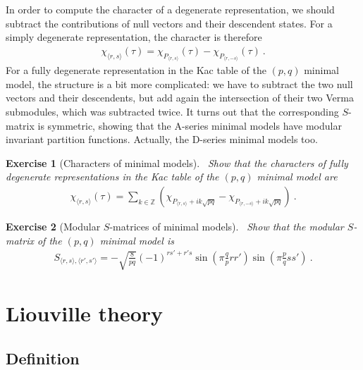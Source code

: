 \documentclass[12pt, a4paper]{article}
\theoremstyle{break}
\newtheorem{exo}{Exercise}[section]
\begin{document}
In order to compute the character of a degenerate representation, we should subtract the contributions of null vectors and their descendent states. For a simply degenerate representation, the character is therefore
\begin{align}
 \chi_{\langle r,s\rangle}(\tau) = \chi_{P_{\langle r,s\rangle}}(\tau) - \chi_{P_{\langle r,-s\rangle}}(\tau)\ .
\end{align}
For a fully degenerate representation in the Kac table of the $(p, q)$ minimal model, the structure is a bit more complicated: we have to subtract the two null vectors and their descendents, but add again the intersection of their two Verma submodules, which was subtracted twice.
It turns out that 
the corresponding $S$-matrix is symmetric, showing that the A-series minimal models have modular invariant partition functions. Actually, the D-series minimal models too. 

\begin{tcolorbox}
\begin{exo}[Characters of minimal models]
 ~\label{exo:chmm}
 Show that the characters of fully degenerate representations in the Kac table of the $(p, q)$ minimal model are
 \begin{align}
 \chi_{\langle r,s\rangle}(\tau) = \sum_{k\in\mathbb{Z}} \left( \chi_{P_{\langle r,s\rangle} + ik\sqrt{pq}} - \chi_{P_{\langle r,-s\rangle} + ik\sqrt{pq}}\right)\ .
 \label{eq:chmm}
\end{align}
\end{exo}

\begin{exo}[Modular $S$-matrices of minimal models]
~\label{exo:mods}
 Show that the modular $S$-matrix of the $(p, q)$ minimal model is 
 \begin{align}
 S_{\langle r,s\rangle, \langle r', s'\rangle} = -\sqrt{\frac{8}{pq}}(-1)^{rs'+r's} \sin\left(\pi\frac{q}{p}rr'\right)\sin\left(\pi\frac{p}{q}ss'\right)\ .
 \label{eq:smm}
\end{align}
\end{exo}
\end{tcolorbox}


\section{Liouville theory}

\subsection{Definition}
\end{document}
